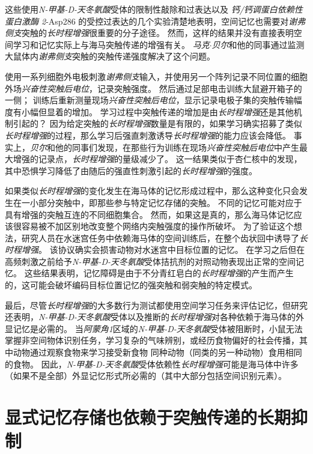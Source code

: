 这些使用\textit{N-甲基-D-天冬氨酸}受体的限制性敲除和过表达以及 \textit{钙/钙调蛋白依赖性蛋白激酶 2}-Asp286 的受控过表达的几个实验清楚地表明，空间记忆也需要对\textit{谢弗侧支}突触的\textit{长时程增强}很重要的分子途径。
然而，这样的结果并没有直接表明空间学习和记忆实际上与海马突触传递的增强有关。
\textit{马克$\cdot$贝尔}和他的同事通过监测大鼠体内\textit{谢弗侧支}突触的突触传递强度解决了这个问题。


使用一系列细胞外电极刺激\textit{谢弗侧支}输入，并使用另一个阵列记录不同位置的细胞外场\textit{兴奋性突触后电位}，记录突触强度。
然后通过足部电击训练大鼠避开箱子的一侧；
训练后重新测量现场\textit{兴奋性突触后电位}，显示记录电极子集的突触传输幅度有小幅但显着的增加。
学习过程中突触传递的增加是由\textit{长时程增强}还是其他机制引起的？
因为给定突触的\textit{长时程增强}数量是有限的，如果学习确实招募了类似\textit{长时程增强}的过程，那么学习后强直刺激诱导\textit{长时程增强}的能力应该会降低。
事实上，\textit{贝尔}和他的同事们发现，在那些行为训练在现场\textit{兴奋性突触后电位}中产生最大增强的记录点，\textit{长时程增强}的量级减少了。
这一结果类似于杏仁核中的发现，其中恐惧学习降低了由随后的强直性刺激引起的\textit{长时程增强}的强度。


如果类似\textit{长时程增强}的变化发生在海马体的记忆形成过程中，那么这种变化只会发生在一小部分突触中，即那些参与特定记忆存储的突触。
不同的记忆可能对应于具有增强的突触互连的不同细胞集合。
然而，如果这是真的，那么海马体记忆应该很容易被不加区别地改变整个网络内突触强度的操作所破坏。
为了验证这个想法，研究人员在水迷宫任务中依赖海马体的空间训练后，在整个齿状回中诱导了\textit{长时程增强}。
该协议确实会损害动物对水迷宫中目标位置的记忆。
在学习之后但在高频刺激之前给予\textit{N-甲基-D-天冬氨酸}受体拮抗剂的对照动物表现出正常的空间记忆。
这些结果表明，记忆障碍是由于不分青红皂白的\textit{长时程增强}的产生而产生的，这可能会破坏编码目标位置记忆的强突触和弱突触的特定模式。


最后，尽管\textit{长时程增强}的大多数行为测试都使用空间学习任务来评估记忆，但研究还表明，\textit{N-甲基-D-天冬氨酸}受体以及推断的\textit{长时程增强}对各种依赖于海马体的外显记忆是必需的。
当\textit{阿蒙角1}区域的\textit{N-甲基-D-天冬氨酸}受体被阻断时，小鼠无法掌握非空间物体识别任务，学习复杂的气味辨别，或经历食物偏好的社会传播，其中动物通过观察食物来学习接受新食物 同种动物（同类的另一种动物）食用相同的食物。
因此，\textit{N-甲基-D-天冬氨酸}受体依赖性\textit{长时程增强}可能是海马体中许多（如果不是全部）外显记忆形式所必需的（其中大部分包括空间识别元素）。



\section{显式记忆存储也依赖于突触传递的长期抑制}

